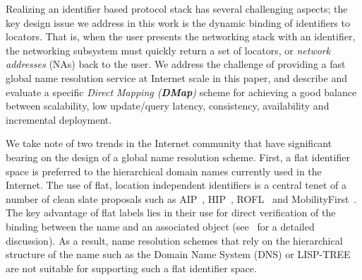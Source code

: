 

Realizing an identifier based protocol stack has
several challenging aspects; the key design issue we address in this work is the
dynamic binding of identifiers to locators. That is, when the user presents
the networking stack with an identifier, the networking subsystem
must quickly return a set of locators, or {\em network addresses} (NAs)
back to the user. We address the challenge of providing a fast global name resolution service at Internet scale in this paper, and describe and evaluate a specific \textit{Direct Mapping (\textbf{DMap})} scheme for achieving a good balance between scalability, low update/query latency, consistency, availability and incremental deployment.

We take note of two trends in the Internet community that have significant bearing on the design of a global name resolution scheme. First, a flat identifier space is preferred to the hierarchical domain names currently used in the Internet. The use of flat, location independent identifiers is a central tenet of a number of clean slate proposals such as AIP~\cite{andersen}, HIP~\cite{moskowitz}, ROFL~\cite{CaesarRofl} and MobilityFirst~\cite{mobilityFirst}. The key advantage of flat labels lies in their use for direct verification of the binding between the name and an associated object (see~\cite{Ghodsi-ICN} for a detailed discussion).  As a result, name resolution schemes that rely on the hierarchical structure of the name such as the Domain Name System (DNS) or LISP-TREE~\cite{jakab} are not suitable for supporting such a flat identifier space.

